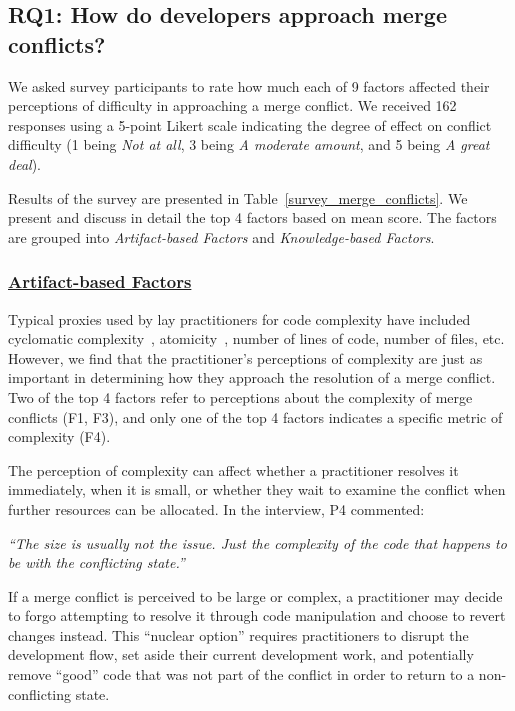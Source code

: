 \subsection{\textbf{RQ1:} How do developers approach merge conflicts?}\label{RQ1}

We asked survey participants to rate how much each of 9 factors affected their perceptions of difficulty in approaching a merge conflict.
We received 162 responses using a 5-point Likert scale indicating the degree of effect on conflict difficulty (1 being \textit{Not at all}, 3 being \textit{A moderate amount}, and 5 being \textit{A great deal}).

Results of the survey are presented in Table~\ref{survey_merge_conflicts}.
We present and discuss in detail the top 4 factors based on mean score.
The factors are grouped into \textit{Artifact-based Factors} and \textit{Knowledge-based Factors}.

\subsubsection{\underline{Artifact-based Factors}}
Typical proxies used by lay practitioners for code complexity have included cyclomatic complexity~\cite{fenton2000quantitative}, atomicity~\cite{khelladi2016ad}, number of lines of code, number of files, etc.
However, we find that the practitioner's perceptions of complexity are just as important in determining how they approach the resolution of a merge conflict.
Two of the top 4 factors refer to perceptions about the complexity of merge conflicts (F1, F3), and only one of the top 4 factors indicates a specific metric of complexity (F4).

The perception of complexity can affect whether a practitioner resolves it immediately, when it is small, or whether they wait to examine the conflict when further resources can be allocated.
In the interview, P4 commented:

\begin{displayquote}
\textit{``The size is usually not the issue. Just the complexity of the code that happens to be with the conflicting state.''}
\end{displayquote}

If a merge conflict is perceived to be large or complex, a practitioner may decide to forgo attempting to resolve it through code manipulation and choose to revert changes instead.
This ``nuclear option'' requires practitioners to disrupt the development flow, set aside their current development work, and potentially remove ``good'' code that was not part of the conflict in order to return to a non-conflicting state.

